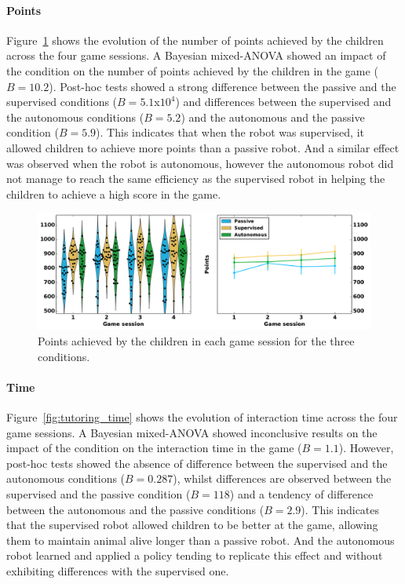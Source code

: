 \paragraph{Points}

Figure~\ref{fig:tutoring_points} shows the evolution of the number of points achieved by the children across the four game sessions. A Bayesian mixed-ANOVA showed an impact of the condition on the number of points achieved by the children in the game ($B=10.2$). Post-hoc tests showed a strong difference between the passive and the supervised conditions ($B=5.1$x$10^4$) and differences between the supervised and the autonomous conditions ($B=5.2$) and the autonomous and the passive condition ($B=5.9$). This indicates that when the robot was supervised, it allowed children to achieve more points than a  passive robot. And a similar effect was observed when the robot is autonomous, however the autonomous robot did not manage to reach the same efficiency as the supervised robot in helping the children to achieve a high score in the game.

\begin{figure}[ht]
	\includegraphics[width=1\linewidth]{points.pdf}
	\centering
	\caption{Points achieved by the children in each game session for the three conditions.}
	\label{fig:tutoring_points}
\end{figure}

\paragraph{Time}

Figure~\ref{fig:tutoring_time} shows the evolution of interaction time across the four game sessions. A Bayesian mixed-ANOVA showed inconclusive results on the impact of the condition on the interaction time in the game ($B=1.1$). However, post-hoc tests showed the absence of difference between the supervised and the autonomous conditions ($B=0.287$), whilst differences are observed between the supervised and the passive condition ($B=118$) and a tendency of difference between the autonomous and the passive conditions ($B=2.9$). This indicates that the supervised robot allowed children to be better at the game, allowing them to maintain animal alive longer than a passive robot. And the autonomous robot learned and applied a policy tending to replicate this effect and without exhibiting differences with the supervised one.

